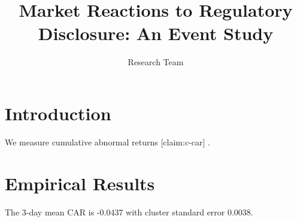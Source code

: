 \documentclass{article}
\newcommand{\result}[2]{#2}
\begin{document}
\title{Market Reactions to Regulatory Disclosure: An Event Study}
\author{Research Team}
\maketitle
\section{Introduction}
We measure cumulative abnormal returns [claim:c-car] \cite{fama1969}.
\section{Empirical Results}
The 3-day mean CAR is \result{primary.car_mean}{-0.0437}
with cluster standard error \result{primary.std_error}{0.0038}.



\end{document}
